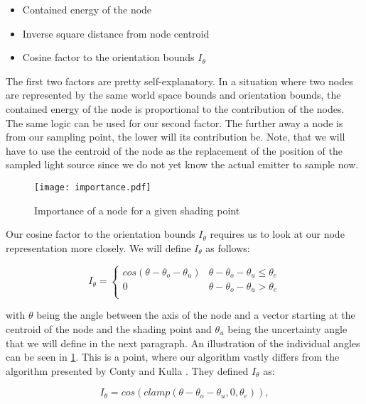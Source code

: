 \begin{itemize}
	\item Contained energy of the node
	\item Inverse square distance from node centroid
	\item Cosine factor to the orientation bounds $I_\theta$
\end{itemize}

The first two factors are pretty self-explanatory. In a situation where two nodes are represented by the same world space bounds and orientation bounds, the contained energy of the node is proportional to the contribution of the nodes. The same logic can be used for our second factor. The further away a node is from our sampling point, the lower will its contribution be. Note, that we will have to use the centroid of the node as the replacement of the position of the sampled light source since we do not yet know the actual emitter to sample now.

\begin{figure}
	\begin{center}
		\texttt{[image: importance.pdf]}
		\caption{Importance of a node for a given shading point}
		\label{fig:importance}
	\end{center}
\end{figure}

Our cosine factor to the orientation bounds $I_\theta$ requires us to look at our node representation more closely. We will define $I_\theta$ as follows:

\begin{equation}
\label{eq:imp}
I_\theta = \begin{cases} 
cos(\theta - \theta_o - \theta_u) & \theta - \theta_o - \theta_u \leq \theta_e \\
0 & \theta - \theta_o - \theta_u > \theta_e \\
\end{cases}
\end{equation}

with $\theta$ being the angle between the axis of the node and a vector starting at the centroid of the node and the shading point and $\theta_u$ being the uncertainty angle that we will define in the next paragraph. An illustration of the individual angles can be seen in \ref{fig:importance}. This is a point, where our algorithm vastly differs from the algorithm presented by Conty and Kulla \cite{MLA,MLS}. They defined $I_\theta$ as:

\begin{equation}
I_\theta = cos(clamp(\theta - \theta_o - \theta_u, 0, \theta_e)),
\end{equation}

